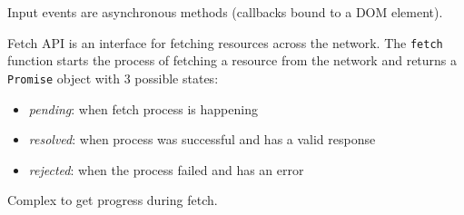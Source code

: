 \documentclass[11pt]{article}
\begin{document}
Input events are asynchronous methods (callbacks bound to a DOM element).

Fetch API is an interface for fetching resources across the network.
The \texttt{fetch} function starts the process of fetching a resource from the network and returns a
\texttt{Promise} object with 3 possible states:
\begin{itemize}
\item \emph{pending}: when fetch process is happening
\item \emph{resolved}: when process was successful and has a valid response
\item \emph{rejected}: when the process failed and has an error
\end{itemize}

Complex to get progress during fetch.
\end{document}
